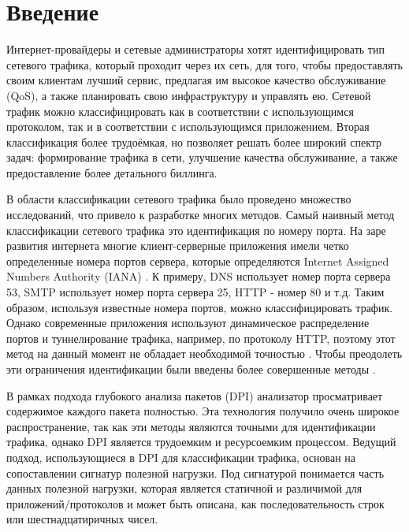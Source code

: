 \section{Введение}
\label{sec:Section0} 

Интернет-провайдеры и сетевые администраторы хотят идентифицировать тип сетевого трафика, который проходит через их сеть, для того,
чтобы предоставлять своим клиентам лучший сервис, предлагая им высокое качество обслуживание (QoS),
а также планировать свою инфраструктуру и управлять ею. Сетевой трафик можно классифицировать как в соответствии с использующимся протоколом,
так и в соответствии с использующимся приложением. Вторая классификация более трудоёмкая, но позволяет решать более широкий спектр задач:
формирование трафика в сети, улучшение качества обслуживание, а также предоставление более детального биллинга.

В области классификации сетевого трафика было проведено множество исследований, что привело к разработке многих методов.
Самый наивный метод классификации сетевого трафика это идентификация по номеру порта.
На заре развития интернета многие клиент-серверные приложения имели четко определенные номера портов сервера,
которые определяются Internet Assigned Numbers Authority (IANA) \cite{IANA}.
К примеру, DNS использует номер порта сервера 53,
SMTP использует номер порта сервера 25, HTTP - номер 80 и т.д.
Таким образом, используя известные номера портов, можно классифицировать трафик.
Однако современные приложения используют динамическое распределение портов и туннелирование трафика, например, по протоколу HTTP,
поэтому этот метод на данный момент не обладает необходимой точностью \cite{dusi2009tunnel}.
Чтобы преодолеть эти ограничения идентификации были введены более совершенные методы \cite{getman2015analys}.

В рамках подхода глубокого анализа пакетов (DPI) анализатор просматривает содержимое каждого пакета полностью.
Эта технология получило очень широкое распространение,
так как эти методы являются точными для идентификации трафика, однако DPI является трудоемким и ресурсоемким процессом.
Ведущий подход, использующиеся в DPI для классификации трафика, основан на сопоставлении сигнатур полезной нагрузки. Под сигнатурой понимается часть данных полезной нагрузки,
которая является статичной и различимой для приложений/протоколов и может быть описана, как последовательность строк или шестнадцатиричных чисел.

